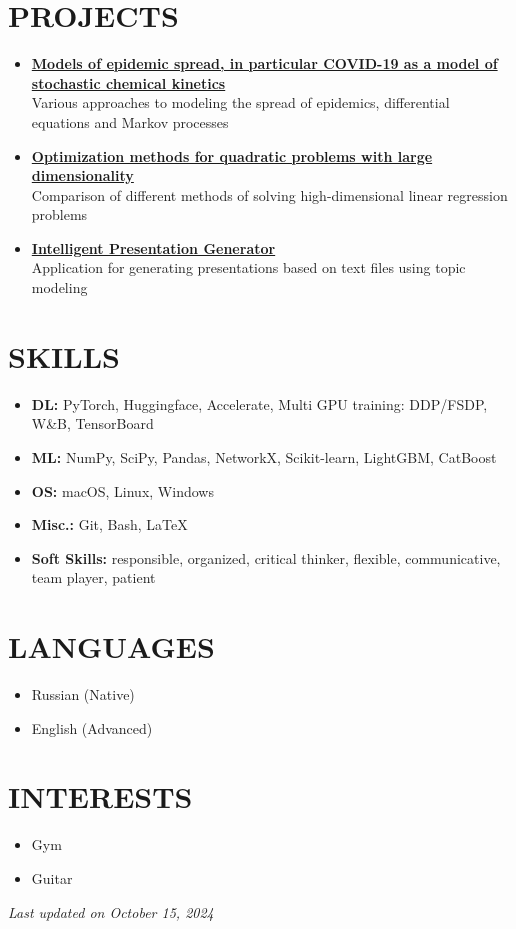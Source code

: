 \documentclass[11pt,a4paper]{moderncv}
\begin{document}
\section{PROJECTS}
\begin{itemize}
    \item \href{https://github.com/kisnikser/Epidemic-Spread-Models}{\textbf{Models of epidemic spread, in particular COVID-19 as a model of stochastic chemical kinetics}}\\
    Various approaches to modeling the spread of epidemics, differential equations and Markov processes
    \item \href{https://github.com/kisnikser/Optimization-Methods}{\textbf{Optimization methods for quadratic problems with large dimensionality}}\\
    Comparison of different methods of solving high-dimensional linear regression problems
    \item \href{https://github.com/kisnikser/Intelligent-Presentation-Generator}{\textbf{Intelligent Presentation Generator}}\\
    Application for generating presentations based on text files using topic modeling
\end{itemize}

\section{SKILLS}
\begin{itemize}
    \item \textbf{DL:} PyTorch, Huggingface, Accelerate, Multi GPU training: DDP/FSDP, W\&B, TensorBoard
    \item \textbf{ML:} NumPy, SciPy, Pandas, NetworkX, Scikit-learn, LightGBM, CatBoost
    \item \textbf{OS:} macOS, Linux, Windows
    \item \textbf{Misc.:} Git, Bash, \LaTeX
    \item \textbf{Soft Skills:} responsible, organized, critical thinker, flexible, communicative, team player, patient
\end{itemize}

\section{LANGUAGES}
\begin{itemize}
    \item Russian (Native)
    \item English (Advanced)
\end{itemize}

\section{INTERESTS}
\begin{itemize}
    \item Gym
    \item Guitar
\end{itemize}

\vspace{\fill}
\begin{center}
\textit{Last updated on October 15, 2024}
\end{center}
\vspace{-3.0cm}
\end{document}
